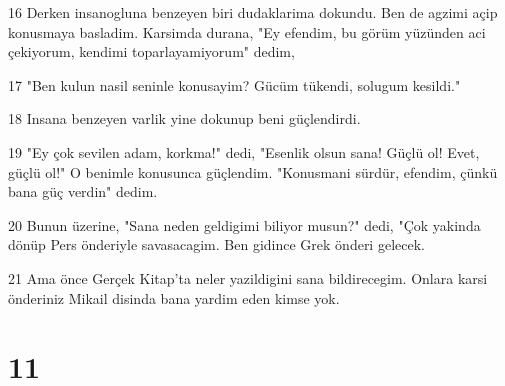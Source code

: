 \par 16 Derken insanogluna benzeyen biri dudaklarima dokundu. Ben de agzimi açip konusmaya basladim. Karsimda durana, "Ey efendim, bu görüm yüzünden aci çekiyorum, kendimi toparlayamiyorum" dedim,
\par 17 "Ben kulun nasil seninle konusayim? Gücüm tükendi, solugum kesildi."
\par 18 Insana benzeyen varlik yine dokunup beni güçlendirdi.
\par 19 "Ey çok sevilen adam, korkma!" dedi, "Esenlik olsun sana! Güçlü ol! Evet, güçlü ol!" O benimle konusunca güçlendim. "Konusmani sürdür, efendim, çünkü bana güç verdin" dedim.
\par 20 Bunun üzerine, "Sana neden geldigimi biliyor musun?" dedi, "Çok yakinda dönüp Pers önderiyle savasacagim. Ben gidince Grek önderi gelecek.
\par 21 Ama önce Gerçek Kitap'ta neler yazildigini sana bildirecegim. Onlara karsi önderiniz Mikail disinda bana yardim eden kimse yok.

\chapter{11}

